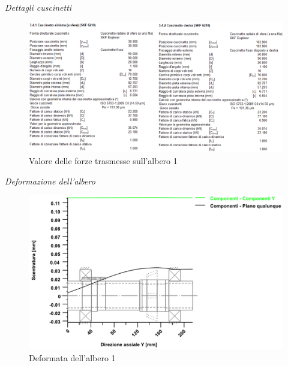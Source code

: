 \emph{Dettagli cuscinetti}
\begin{figure}[h]
    \centering
    \includegraphics[scale=0.7]{Immagini/ForzeCuscinettiAlbero1.png}
    \caption{Valore delle forze trasmesse sull'albero 1}
    \label{fig:ForzeCusinettiAlbero1}
\end{figure}
\newpage
\emph{Deformazione dell'albero}
\begin{figure}[h]
    \centering
    \includegraphics[scale=0.6]{Immagini/DeformataAlbero1.png}
    \caption{Deformata dell'albero 1}
    \label{fig:Deformata albero 1}
\end{figure}


